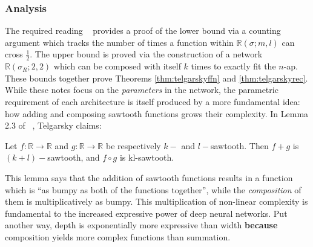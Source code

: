 \documentclass{article}
\begin{document}
\subsubsection{Analysis}
The required reading ~\citep{telgarsky2015representation} provides a proof of the lower bound via a counting argument which tracks the number of times a function within $\mathbb{R}(\sigma;m,l)$ can cross $\frac{1}{2}$. The upper bound is proved via the construction of a network $\mathbb{R}(\sigma_R; 2, 2)$ which can be composed with itself $k$ times to exactly fit the $n$-ap. These bounds together prove Theorems \ref{thm:telgarskyffn} and \ref{thm:telgarskyrec}.\\

While these notes focus on the \textit{parameters} in the network, the parametric requirement of each architecture is itself produced by a more fundamental idea: how adding and composing sawtooth functions grows their complexity. In Lemma 2.3 of ~\citep{telgarsky2015representation}, Telgarsky claims:

\begin{lemma}
Let $f: \mathbb{R} \to \mathbb{R}$ and $g: \mathbb{R} \to \mathbb{R}$ be respectively $k-$ and $l-$sawtooth. Then $f + g$ is $(k + l)-$sawtooth, and $f \circ g$ is kl-sawtooth.
\end{lemma}

This lemma says that the addition of sawtooth functions results in a function which is ``as bumpy as both of the functions together'', while the \textit{composition} of them is multiplicatively as bumpy. This multiplication of non-linear complexity is fundamental to the increased expressive power of deep neural networks. Put another way, depth is exponentially more expressive than width \textbf{because} composition yields more complex functions than summation.




\end{document}
